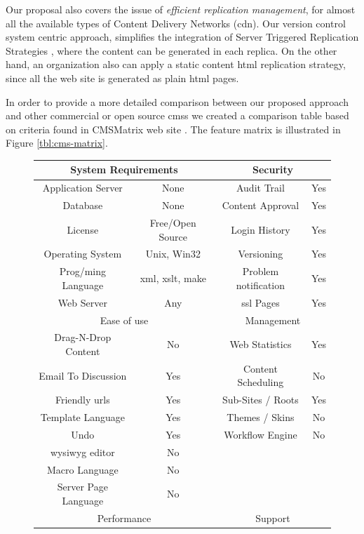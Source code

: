 \documentclass{elsart}
\begin{document}
Our proposal also covers the issue of \textit{efficient replication
management}, for almost all the available types of Content Delivery
Networks ({\sc cdn}).
Our version control system centric approach, simplifies the integration
of Server Triggered Replication Strategies \cite{SSPS04}, where the
content can be generated in each replica.
On the other hand, an organization also can apply a static content {\sc
html} replication strategy, since all the web site is generated as plain
{\sc html} pages.

In order to provide a more detailed comparison between our proposed approach and other commercial or open source {\sc cms}s we
created a comparison table based on criteria found in CMSMatrix web site \cite{PBC05}. The feature matrix is illustrated in Figure \ref{tbl:cms-matrix}.

\begin{figure}
\begin{center}
\begin{tabular}{c c | c c}
\hline
\multicolumn{2}{c|}{System Requirements} & \multicolumn{2}{c}{Security}\\
\hline
Application Server & None & Audit Trail & Yes\\
Database & None & Content Approval & Yes\\
License & Free/Open Source & Login History & Yes\\
Operating System & Unix, Win32 & Versioning & Yes\\
Prog/ming Language & {\sc xml, xslt}, make & Problem notification & Yes\\
Web Server & Any & {\sc ssl} Pages & Yes\\
\hline
\multicolumn{2}{c|}{Ease of use} & \multicolumn{2}{c}{Management}\\
\hline
Drag-N-Drop Content & No & Web Statistics & Yes\\
Email To Discussion & Yes & Content Scheduling & No\\
Friendly {\sc url}s & Yes & Sub-Sites / Roots & Yes\\
Template Language & Yes & Themes / Skins & No\\
Undo & Yes & Workflow Engine & No\\
{\sc wysiwyg} editor & No & &\\
Macro Language & No & &\\
Server Page Language & No & &\\
\hline
\multicolumn{2}{c|}{Performance} & \multicolumn{2}{c}{Support}\\

\end{tabular}
\end{center}
\end{figure}
\end{document}
